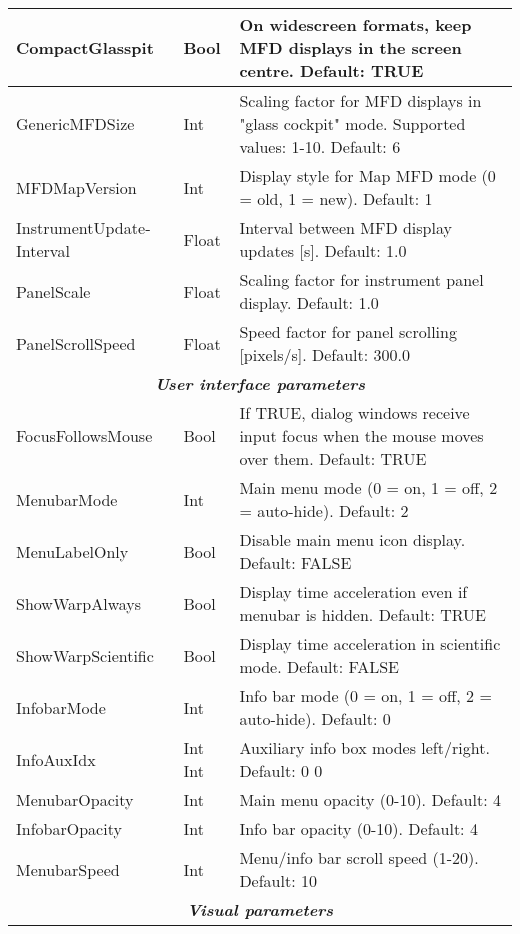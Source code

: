 \documentclass[Orbiter User Manual.tex]{subfiles}
\begin{document}
\begin{longtable}{ |p{}|p{}|p{}| }
	\hline\rule{0pt}{2ex}
	CompactGlasspit & Bool & On widescreen formats, keep MFD displays in the screen centre. Default: TRUE\\
	\hline\rule{0pt}{2ex}
	GenericMFDSize & Int & Scaling factor for MFD displays in "glass cockpit" mode. Supported values: 1-10. Default: 6\\
	\hline\rule{0pt}{2ex}
	MFDMapVersion & Int & Display style for Map MFD mode (0 = old, 1 = new). Default: 1\\
	\hline\rule{0pt}{2ex}
	InstrumentUpdate­Interval & Float & Interval between MFD display updates [s]. Default: 1.0\\
	\hline\rule{0pt}{2ex}
	PanelScale & Float & Scaling factor for instrument panel display. Default: 1.0\\
	\hline\rule{0pt}{2ex}
	PanelScrollSpeed & Float & Speed factor for panel scrolling [pixels/s]. Default: 300.0\\
	\hline
	\multicolumn{3}{|c|}{\rule{0pt}{2ex}\textbf{\textit{User interface parameters}}}\\
	\hline\rule{0pt}{2ex}
	FocusFollowsMouse & Bool & If TRUE, dialog windows receive input focus when the mouse moves over them. Default: TRUE\\
	\hline\rule{0pt}{2ex}
	MenubarMode & Int & Main menu mode (0 = on, 1 = off, 2 = auto-hide). Default: 2\\
	\hline\rule{0pt}{2ex}
	MenuLabelOnly & Bool & Disable main menu icon display. Default: FALSE\\
	\hline\rule{0pt}{2ex}
	ShowWarpAlways & Bool & Display time acceleration even if menubar is hidden. Default: TRUE\\
	\hline\rule{0pt}{2ex}
	ShowWarpScientific & Bool & Display time acceleration in scientific mode. Default: FALSE\\
	\hline\rule{0pt}{2ex}
	InfobarMode & Int & Info bar mode (0 = on, 1 = off, 2 = auto-hide). Default: 0\\
	\hline\rule{0pt}{2ex}
	InfoAuxIdx & Int Int & Auxiliary info box modes left/right. Default: 0 0\\
	\hline\rule{0pt}{2ex}
	MenubarOpacity & Int & Main menu opacity (0-10). Default: 4\\
	\hline\rule{0pt}{2ex}
	InfobarOpacity & Int & Info bar opacity (0-10). Default: 4\\
	\hline\rule{0pt}{2ex}
	MenubarSpeed & Int & Menu/info bar scroll speed (1-20). Default: 10\\
	\hline
	\multicolumn{3}{|c|}{\rule{0pt}{2ex}\textbf{\textit{Visual parameters}}}\\

\end{longtable}
\end{document}
